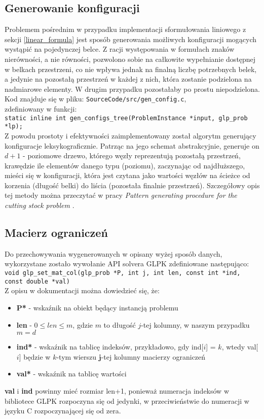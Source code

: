 \subsection{Generowanie konfiguracji}
Problemem pośrednim w przypadku implementacji sformułowania liniowego z sekcji \ref{linear_formula} jest sposób generowania możliwych konfiguracji mogących wystąpić na pojedynczej belce.
Z racji występowania w formułach znaków nierówności, a nie równości, pozwolono sobie na całkowite wypełnianie dostępnej w belkach przestrzeni, co nie wpływa jednak na finalną liczbę potrzebnych belek, a jedynie na pozostałą przestrzeń w każdej z nich, która zostanie podzielona na nadmiarowe elementy. W drugim przypadku pozostałaby po prostu niepodzielona.\\
Kod znajduje się w pliku: \verb|SourceCode/src/gen_config.c|,  \\ zdefiniowany w funkcji: \\ \verb|static inline int gen_configs_tree(ProblemInstance *input, glp_prob *lp);| \\
Z powodu prostoty i efektywności zaimplementowany został algorytm generujący konfiguracje leksykograficznie. Patrząc na jego schemat abstrakcyjnie, generuje on $d + 1$ - poziomowe drzewo, którego węzły reprezentują pozostałą przestrzeń, krawędzie ile elementów danego typu (poziomu), zaczynając od najdłuższego, mieści się w konfiguracji, która jest czytana jako wartości węzłów na ścieżce od korzenia (długość belki) do liścia (pozostała finalnie przestrzeń).
Szczegółowy opis tej metody można przeczytać w pracy \textit{Pattern generating procedure for the cutting stock problem} \cite{GEN_CONFIGS}. \\

\subsection{Macierz ograniczeń} \label{macierz_ograniczen}
Do przechowywania wygenerowanych w opisany wyżej sposób danych, wykorzystane zostało wywołanie API solvera GLPK zdefiniowane następująco: \\
\verb|void glp_set_mat_col(glp_prob *P, int j, int len, const int *ind, const double *val)| \\
Z opisu w dokumentacji \cite{GLPK_DOCS} można dowiedzieć się, że:
\begin{itemize}
	\item \textbf{P*} - wskaźnik na obiekt będący instancją problemu
	\item \textbf{len} - $0 \leq len \leq m$, gdzie $m$ to długość $j$-tej kolumny, w naszym przypadku $m = d$
	\item \textbf{ind*} - wskaźnik na tablicę indeksów, przykładowo, gdy ind[$i$] = $k$, wtedy val[$i$] będzie w $k$-tym wierszu $\mathbf{j}$-tej kolumny macierzy ograniczeń
	\item \textbf{val*} - wskaźnik na tablicę wartości
\end{itemize}
\textbf{val} i \textbf{ind} powinny mieć rozmiar len+1, ponieważ numeracja indeksów w bibliotece GLPK rozpoczyna się od jedynki, w przeciwieństwie do numeracji w języku C rozpoczynającej się od zera. \\

